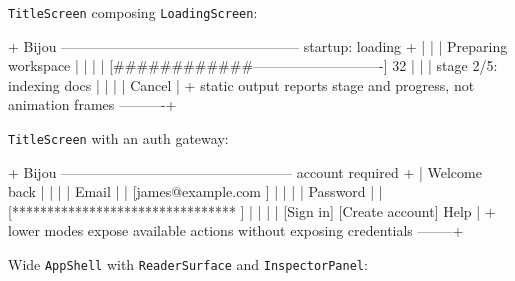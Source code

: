 \texttt{T\allowbreak{}i\allowbreak{}t\allowbreak{}l\allowbreak{}e\allowbreak{}S\allowbreak{}c\allowbreak{}r\allowbreak{}e\allowbreak{}e\allowbreak{}n} composing \texttt{L\allowbreak{}o\allowbreak{}a\allowbreak{}d\allowbreak{}i\allowbreak{}n\allowbreak{}g\allowbreak{}S\allowbreak{}c\allowbreak{}r\allowbreak{}e\allowbreak{}e\allowbreak{}n}:

\begin{CodeBlock}
+ Bijou --------------------------------------------------- startup: loading +
|                                                                          |
|                         Preparing workspace                              |
|                                                                          |
|  [############----------------------------]  32%
|                                                                          |
|  stage 2/5: indexing docs                                                |
|                                                                          |
|  Cancel                                                                  |
+ static output reports stage and progress, not animation frames ----------+
\end{CodeBlock}

\texttt{T\allowbreak{}i\allowbreak{}t\allowbreak{}l\allowbreak{}e\allowbreak{}S\allowbreak{}c\allowbreak{}r\allowbreak{}e\allowbreak{}e\allowbreak{}n} with an auth gateway:

\begin{CodeBlock}
+ Bijou -------------------------------------------------- account required +
| Welcome back                                                             |
|                                                                          |
| Email                                                                    |
| [james@example.com                    ]                                  |
|                                                                          |
| Password                                                                 |
| [********************************      ]                                  |
|                                                                          |
| [Sign in]     [Create account]                                  Help     |
+ lower modes expose available actions without exposing credentials --------+
\end{CodeBlock}

Wide \texttt{A\allowbreak{}p\allowbreak{}p\allowbreak{}S\allowbreak{}h\allowbreak{}e\allowbreak{}l\allowbreak{}l} with \texttt{R\allowbreak{}e\allowbreak{}a\allowbreak{}d\allowbreak{}e\allowbreak{}r\allowbreak{}S\allowbreak{}u\allowbreak{}r\allowbreak{}f\allowbreak{}a\allowbreak{}c\allowbreak{}e} and \texttt{I\allowbreak{}n\allowbreak{}s\allowbreak{}p\allowbreak{}e\allowbreak{}c\allowbreak{}t\allowbreak{}o\allowbreak{}r\allowbreak{}P\allowbreak{}a\allowbreak{}n\allowbreak{}e\allowbreak{}l}:

